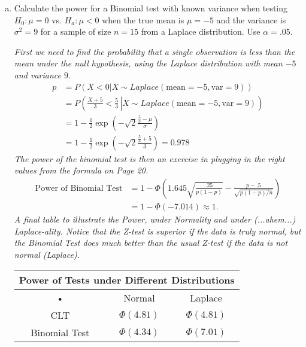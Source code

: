 \documentclass[12pt]{article}
\begin{document}
\begin{enumerate}[(a)]
\item Calculate the power for a Binomial test with known variance when testing $H_0: \mu = 0$ vs. $H_a: \mu < 0$ when the true mean is $\mu=−5$ and the variance is $\sigma^2 =9$ for a sample of size $n = 15$ from a Laplace distribution. Use $\alpha = .05$. 

\emph{First we need to find the probability that a single observation is less than the mean under the null hypothesis, using the Laplace distribution with mean $-5$ and variance $9$.}
\begin{align*}
p &= P \left. \left( X < 0 \right| X \sim Laplace(\mbox{mean}=-5, \mbox{var} = 9) \right) \\
&= P \left. \left( \frac{X+5}{3} < \frac{5}{3} \, \right| X \sim Laplace(\mbox{mean}=-5, \mbox{var} = 9) \right) \\
& = 1 - \frac{1}{2} \exp \left( - \sqrt{2} \frac{\frac{5}{3}-\mu} {\sigma} \right) \tag*{(Found this CDF on Wikipedia's Laplace page)}\\
& = 1 - \frac{1}{2} \exp \left( - \sqrt{2} \frac{\frac{5}{3}+5}{3} \right) = 0.978
\end{align*}
\emph{The power of the binomial test is then an exercise in plugging in the right values from the formula on Page 20.}
\begin{align*}
\mbox{Power of Binomial Test} 
& = 1-\Phi \left( 1.645 \sqrt{\frac{.25}{p(1-p)}} - \frac{p-.5}{\sqrt{p(1-p)/n}} \right)\\
& = 1-\Phi \left( -7.014 \right) \approx 1.
\end{align*}
\emph{A final table to illustrate the Power, under Normality and under (...ahem...) Laplace-ality. Notice that the Z-test is superior if the data is truly normal, but the Binomial Test does much better than the usual Z-test if the data is not normal (Laplace).}
\begin{table}[H] \center
\begin{tabular}{|c|c|c|} \hline 
\multicolumn{3}{|c|}{Power of Tests under Different Distributions} \\ \hline 
• & Normal & Laplace \\ \hline 
CLT & $\Phi\left( 4.81 \right)$ & $\Phi\left( 4.81 \right)$ \\ \hline 
Binomial Test & $\Phi \left( 4.34 \right)$ & $\Phi \left( 7.01 \right)$ \\ \hline 
\end{tabular} 
\end{table}
\end{enumerate}
\end{document}
